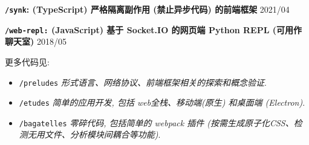 \documentclass[10pt]{article}
\begin{document}
\vspace{0.5em}
\textbf{\texttt{/synk}:  (TypeScript) 严格隔离副作用 (禁止异步代码) 的前端框架} \hfill 2021/04

\vspace{0.5em}
\textbf{\texttt{/web-repl:} (JavaScript) 基于 Socket.IO 的网页端 Python REPL (可用作聊天室)}  \hfill 2018/05 


\vspace{1em}
更多代码见: 
\begin{itemize}
\item \texttt{/preludes} \textit{形式语言、网络协议、前端框架相关的探索和概念验证}.
\item \texttt{/etudes} \textit{简单的应用开发, 包括 web全栈、移动端\textup(原生\textup) 和桌面端 \textup(Electron\textup)}.
\item \texttt{/bagatelles} \textit{零碎代码, 包括简单的 webpack 插件 \textup(按需生成原子化CSS、检测无用文件、分析模块间耦合等功能\textup)}.
\end{itemize}
\end{document}
